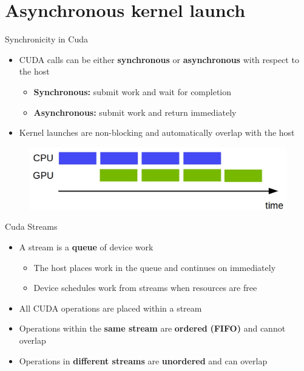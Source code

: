 \documentclass[9pt]{beamer}
\newcommand{\emphasize}[1]{\textbf{\color{red} #1 } }
\begin{document}
\section{Asynchronous kernel launch}
\begin{frame}{Synchronicity in Cuda}
\begin{itemize}
\item CUDA calls can be either \textbf{synchronous} or \textbf{asynchronous} with respect to
the host
\begin{itemize}
\item \emphasize{Synchronous:} submit work and wait for completion
\smallskip
\item \emphasize{Asynchronous:} submit work and return immediately
\end{itemize}
\medskip
\item Kernel launches are non-blocking and automatically overlap with the
host
\end{itemize}

\begin{figure}
\includegraphics[scale=0.25]{images/ans-kernel-exe-1.jpg}
\centering
\end{figure}
\end{frame}


\begin{frame}[t]{Cuda Streams}
\begin{itemize}
\item A stream is a \textbf{queue} of device work
	\begin{itemize}
	\item The host places work in the queue and continues on immediately
	\item Device schedules work from streams when resources are free
	\end{itemize}

\item All CUDA operations are placed within a stream

\item Operations within the \emphasize{same stream} are \emphasize{ordered} \textbf{(FIFO)} and
cannot overlap

\item Operations in \emphasize{different streams} are \emphasize{unordered} and can
overlap

\end{itemize}
\end{frame}
\end{document}
